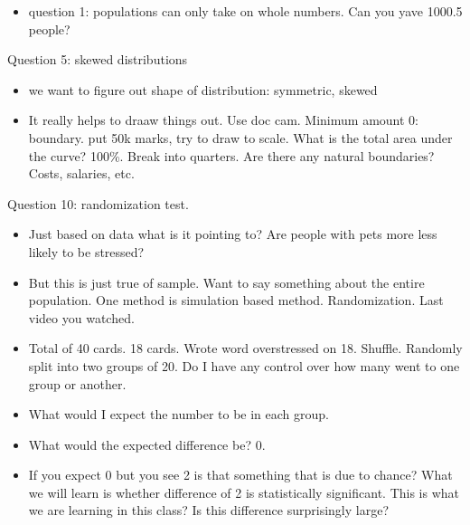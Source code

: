 \documentclass[11pt,containsverbatim,handout,xcolor=xelatex,dvipsnames,table]{beamer}
\begin{document}
\begin{frame}
{\begin{itemize}
\item question 1: populations can only take on whole numbers.  Can you yave 1000.5 people?

\end{itemize}

Question 5: skewed distributions
\begin{itemize}
\item we want to figure out shape of distribution: symmetric, skewed

\item It really helps to draaw things out.  Use doc cam.  Minimum amount 0:
  boundary.  put 50k marks, try to draw to scale.  What is the total area under
  the curve?  100\%.  Break into quarters.  Are there any natural boundaries?
  Costs, salaries, etc.

\end{itemize}


Question 10: randomization test.
\begin{itemize}

\item Just based on data what is it pointing to?  Are people with pets more less likely to be stressed?

\item But this is just true of sample.  Want to say something about the
entire population.  One method is simulation based method.  Randomization.  Last
video you watched.

\item Total of 40 cards.  18 cards.  Wrote word overstressed on 18.  Shuffle.
Randomly split into two groups of 20.  Do I have any control over how many went
to one group or another.  

\item What would I expect the number to be in each group.

\item What would the expected difference be?  0. 

\item If you expect 0 but you see 2 is that something that is due to chance? What we will learn is whether difference of 2 is statistically significant.  This is what we are learning in this class?  Is this difference surprisingly large?

\end{itemize} 

}

\end{frame}

\end{document}
